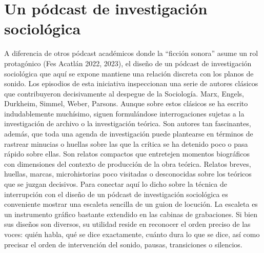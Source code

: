\documentclass[
  spanish,
  11pt,
  a4paper,
]{scrbook}
\begin{document}
\section*{Un pódcast de investigación
sociológica}\label{un-puxf3dcast-de-investigaciuxf3n-socioluxf3gica}


A diferencia de otros pódcast académicos donde la ``ficción sonora''
asume un rol protagónico (Fes Acatlán 2022, 2023), el diseño de un
pódcast de investigación sociológica que aquí se expone mantiene una
relación discreta con los planos de sonido. Los episodios de esta
iniciativa inspeccionan una serie de autores clásicos que contribuyeron
decisivamente al despegue de la Sociología. Marx, Engels, Durkheim,
Simmel, Weber, Parsons. Aunque sobre estos clásicos se ha escrito
indudablemente muchísimo, siguen formulándose interrogaciones sujetas a
la investigación de archivo o la investigación teórica. Son autores tan
fascinantes, además, que toda una agenda de investigación puede
plantearse en términos de rastrear minucias o huellas sobre las que la
crítica se ha detenido poco o pasa rápido sobre ellas. Son relatos
compactos que entretejen momentos biográficos con dimensiones del
contexto de producción de la obra teórica. Relatos breves, huellas,
marcas, microhistorias poco visitadas o desconocidas sobre los teóricos
que se juzgan decisivos. Para conectar aquí lo dicho sobre la técnica de
interrupción con el diseño de un pódcast de investigación sociológica es
conveniente mostrar una escaleta sencilla de un guion de locución. La
escaleta es un instrumento gráfico bastante extendido en las cabinas de
grabaciones. Si bien sus diseños son diversos, su utilidad reside en
reconocer el orden preciso de las voces: quién habla, qué se dice
exactamente, cuánto dura lo que se dice, así como precisar el orden de
intervención del sonido, pausas, transiciones o silencios.

\begingroup
\scriptsize
\end{document}
